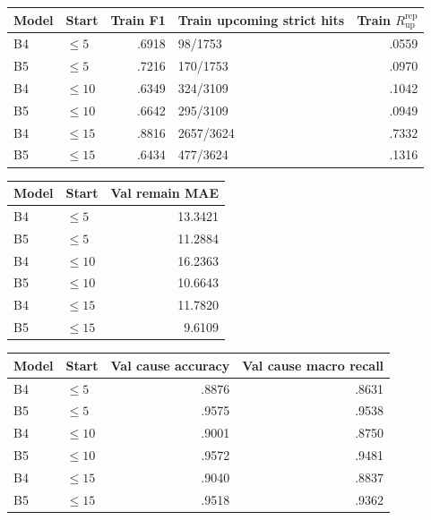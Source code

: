 \documentclass[10pt,a4paper]{article}
\newcommand{\uprep}{$R_{\mathrm{up}}^{\mathrm{rep}}$}
\begin{document}
\begin{center}
\label{tab:b45-train}
\scriptsize
\begin{tabular}{llrlr}
\toprule
Model & Start & Train F1 & Train upcoming strict hits & Train \uprep \\
\midrule
B4 & $\leq5$  & .6918 & 98/1753   & .0559 \\
B5 & $\leq5$  & .7216 & 170/1753  & .0970 \\
B4 & $\leq10$ & .6349 & 324/3109  & .1042 \\
B5 & $\leq10$ & .6642 & 295/3109  & .0949 \\
B4 & $\leq15$ & .8816 & 2657/3624 & .7332 \\
B5 & $\leq15$ & .6434 & 477/3624  & .1316 \\
\bottomrule
\end{tabular}
\end{center}

\begin{center}
\scriptsize
\begin{tabular}{llr}
\toprule
Model & Start & Val remain MAE \\
\midrule
B4 & $\leq5$  & 13.3421 \\
B5 & $\leq5$  & 11.2884 \\
B4 & $\leq10$ & 16.2363 \\
B5 & $\leq10$ & 10.6643 \\
B4 & $\leq15$ & 11.7820 \\
B5 & $\leq15$ &  9.6109 \\
\bottomrule
\end{tabular}
\end{center}

\begin{center}
\scriptsize
\begin{tabular}{llrr}
\toprule
Model & Start & Val cause accuracy & Val cause macro recall \\
\midrule
B4 & $\leq5$  & .8876 & .8631 \\
B5 & $\leq5$  & .9575 & .9538 \\
B4 & $\leq10$ & .9001 & .8750 \\
B5 & $\leq10$ & .9572 & .9481 \\
B4 & $\leq15$ & .9040 & .8837 \\
B5 & $\leq15$ & .9518 & .9362 \\
\bottomrule
\end{tabular}
\end{center}
\end{document}
